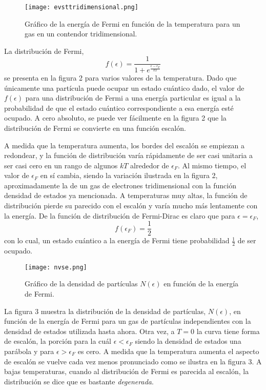\documentclass[12pt,a4paper]{article}
\def\e{{\epsilon}} %
\begin{document}
\begin{figure}[ht!]
\begin{center}
\texttt{[image: evsttridimensional.png]}
\caption{Gráfico de la energía de Fermi en función de la temperatura para un gas en un contendor tridimensional.}
\end{center}
\end{figure}

La distribución de Fermi,
\[ f(\e)=\frac{1}{1+e^{\frac{\e-\e_{F}}{kT}}} \]
se presenta en la figura 2 para varios valores de la temperatura. Dado que únicamente una partícula puede ocupar un estado cuántico dado, el valor de $f(\e)$ para una distribución de Fermi a una energía particular es igual a la probabilidad de que el estado cuántico correspondiente a esa energía esté ocupado. A cero absoluto, se puede ver fácilmente en la figura 2 que la distribución de Fermi se convierte en una función escalón.

A medida que la temperatura aumenta, los bordes del escalón se empiezan a redondear, y la función de distribución varía rápidamente de ser casi unitaria a ser casi cero en un rango de algunos $kT$ alrededor de $\e_{F}$. Al mismo tiempo, el valor de $\e_{F}$ en sí cambia, siendo la variación ilustrada en la figura 2, aproximadamente la de un gas de electrones tridimensional con la función densidad de estados ya mencionada. A temperaturas muy altas, la función de distribución pierde su parecido con el escalón y varía mucho más lentamente con la energía. De la función de distribución de Fermi-Dirac es claro que para $\e=\e_{F}$,
\[ f(\e_{F})=\frac{1}{2} \]
con lo cual, un estado cuántico a la energía de Fermi tiene probabilidad $\frac{1}{2}$ de ser ocupado.

\begin{figure}[ht!]
\begin{center}
\texttt{[image: nvse.png]}
\caption{Gráfico de la densidad de partículas $N(\e)$ en función de la energía de Fermi.}
\end{center}
\end{figure}

La figura 3 muestra la distribución de la densidad de partículas, $N(\e)$, en función de la energía de Fermi para un gas de partículas independientes con la densidad de estados utilizada hasta ahora. Otra vez, a $T=0$ la curva tiene forma de escalón, la porción para la cuál $\e<\e_{F}$ siendo la densidad de estados una parábola y para $\e > \e_{F}$ es cero. A medida que la temperatura aumenta el aspecto de escalón se vuelve cada vez menos pronunciado como se ilustra en la figura 3. A bajas temperaturas, cuando al distribución de Fermi es parecida al escalón, la distribución se dice que es bastante \emph{degenerada}.
\end{document}
